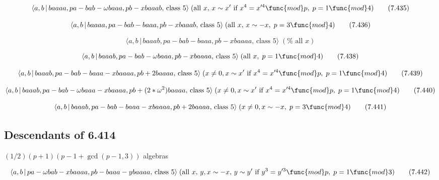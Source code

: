 \documentclass[10pt]{article}
\begin{document}
\begin{equation}
\langle a,b\,|\,baaaa,pa-bab-\omega baaa,pb-xbaaab,\,\text{class }5\rangle
\;(\text{all }x,\,x\sim x^{\prime }\ \text{if}\ x^{4}=x^{\prime 4}\func{mod}%
p,\;p=1\func{mod}4)  \tag{7.435}
\end{equation}

\begin{equation}
\langle a,b\,|\,baaaa,pa-bab-baaa,pb-xbaaab,\,\text{class }5\rangle \;(\text{%
all }x,\,x\sim -x,\;p=3\func{mod}4)  \tag{7.436}
\end{equation}

\begin{equation}
\langle a,b\,|\,baaab,pa-bab-baaa,pb-xbaaaa,\,\text{class }5\rangle \;(\text{%
all }x)  \tag{7.437}
\end{equation}

\begin{equation}
\langle a,b\,|\,baaab,pa-bab-\omega baaa,pb-xbaaaa,\,\text{class }5\rangle
\;(\text{all }x,\;p=1\func{mod}4)  \tag{7.438}
\end{equation}

\begin{equation}
\langle a,b\,|\,baaab,pa-bab-baaa-xbaaaa,pb+2baaaa,\,\text{class }5\rangle
\;(x\neq 0,x\sim x^{\prime }\ \text{if}\ x^{4}=x^{\prime 4}\func{mod}p,\;p=1%
\func{mod}4)  \tag{7.439}
\end{equation}

\begin{equation}
\langle a,b\,|\,baaab,pa-bab-\omega baaa-xbaaaa,pb+(2\ast \omega
^{2})baaaa,\,\text{class }5\rangle \;(x\neq 0,x\sim x^{\prime }\ \text{if}\
x^{4}=x^{\prime 4}\func{mod}p,\;p=1\func{mod}4)  \tag{7.440}
\end{equation}

\begin{equation}
\langle a,b\,|\,baaab,pa-bab-baaa-xbaaaa,pb+2baaaa,\,\text{class }5\rangle
\;(x \neq 0, x \sim -x,\;p=3 \func{mod} 4)  \tag{7.441}
\end{equation}

\subsection{Descendants of 6.414}

$(1/2)(p+1)(p-1+\gcd (p-1,3))$ algebras

\begin{equation}
\langle a,b\,|\,pa-\omega bab-xbaaaa,pb-baaa-ybaaaa,\,\text{class }5\rangle
\;(\text{all }x,\,y,x\sim -x,\,y \sim y^{\prime }\text{ if }y^3=y^{\prime 3}%
\func{mod}p,\;p=1\func{mod}3)  \tag{7.442}
\end{equation}
\end{document}
